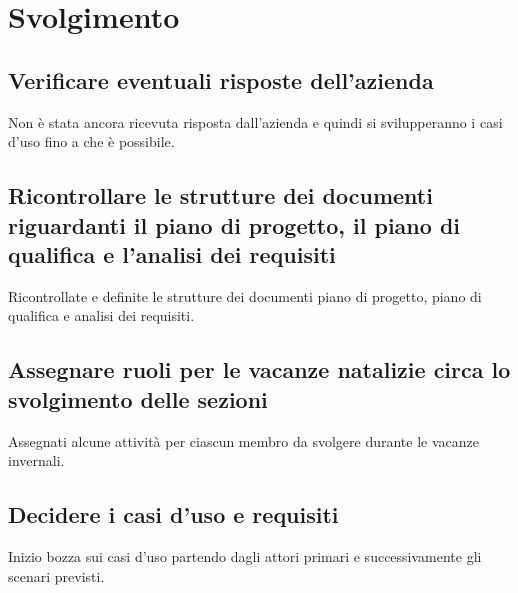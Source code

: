 \newpage
\section*{Svolgimento}

	\subsection*{Verificare eventuali risposte dell'azienda}
		Non è stata ancora ricevuta risposta dall'azienda e quindi si svilupperanno i casi d'uso fino a che è possibile.
	\subsection*{Ricontrollare le strutture dei documenti riguardanti il piano di progetto, il piano di qualifica e l'analisi dei requisiti}
		Ricontrollate e definite le strutture dei documenti piano di progetto, piano di qualifica e analisi dei requisiti.
	\subsection*{Assegnare ruoli per le vacanze natalizie circa lo svolgimento delle sezioni}
		Assegnati alcune attività per ciascun membro da svolgere durante le vacanze invernali.
	\subsection*{Decidere i casi d'uso e requisiti}
		Inizio bozza sui casi d'uso partendo dagli attori primari e successivamente gli scenari previsti.